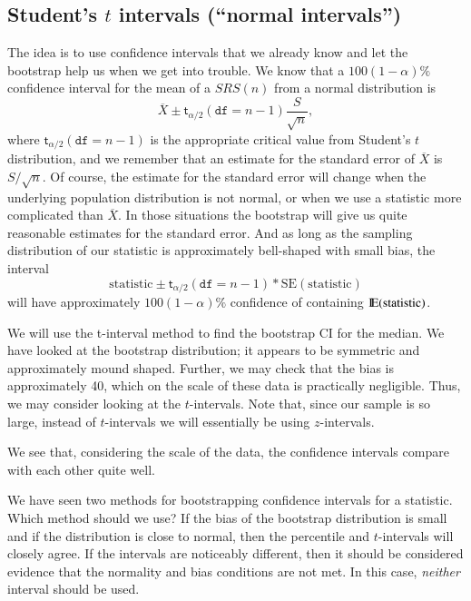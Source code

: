 \documentclass[captions=tableheading]{scrbook}
\begin{document}
\subsection{Student's \(t\) intervals (``normal intervals'')}
\label{sec-13-3-2}


The idea is to use confidence intervals that we already know and let the bootstrap help us when we get into trouble. We know that a \(100(1-\alpha)\%\) confidence interval for the mean of a \(SRS(n)\) from a normal distribution is 
\begin{equation} 
\overline{X}\pm\mathsf{t}_{\alpha/2}(\mathtt{df}=n-1)\frac{S}{\sqrt{n}},
\end{equation} 
where \(\mathsf{t}_{\alpha/2}(\mathtt{df}=n-1)\) is the appropriate critical value from Student's \(t\) distribution, and we remember that an estimate for the standard error of \(\overline{X}\) is \(S/\sqrt{n}\). Of course, the estimate for the standard error will change when the underlying population distribution is not normal, or when we use a statistic more complicated than \(\overline{X}\). In those situations the bootstrap will give us quite reasonable estimates for the standard error. And as long as the sampling distribution of our statistic is approximately bell-shaped with small bias, the interval 
\begin{equation}
\mbox{statistic}\pm\mathsf{t}_{\alpha/2}(\mathtt{df}=n-1)*\mathrm{SE}(\mbox{statistic})
\end{equation}
 will have approximately \(100(1-\alpha)\%\) confidence of containing \(\mathrm{I\hspace{-1.5pt}E}(\mathrm{statistic})\). 

\begin{example}
We will use the t-interval method to find the bootstrap CI for the median. We have looked at the bootstrap distribution; it appears to be symmetric and approximately mound shaped. Further, we may check that the bias is approximately 40, which on the scale of these data is practically negligible. Thus, we may consider looking at the \(t\)-intervals. Note that, since our sample is so large, instead of \(t\)-intervals we will essentially be using \(z\)-intervals. 
\end{example}

We see that, considering the scale of the data, the confidence intervals compare with each other quite well.

\begin{rem}
We have seen two methods for bootstrapping confidence intervals for a statistic. Which method should we use? If the bias of the bootstrap distribution is small and if the distribution is close to normal, then the percentile and \(t\)-intervals will closely agree. If the intervals are noticeably different, then it should be considered evidence that the normality and bias conditions are not met. In this case, \emph{neither} interval should be used.
\end{rem}
\end{document}
